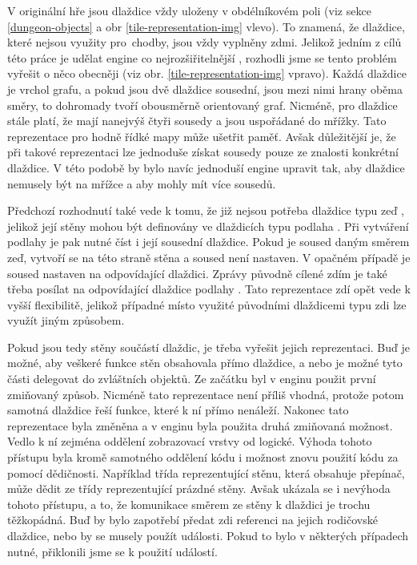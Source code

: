 V originální hře jsou dlaždice vždy uloženy v obdélníkovém poli (viz sekce \ref{dungeon-objects} a obr \ref{tile-representation-img} vlevo).
To znamená, že dlaždice, které nejsou využity pro~chodby, jsou vždy vyplněny zdmi. Jelikož jedním z cílů této práce je udělat engine co 
nejrozšiřitelnější , rozhodli jsme se tento problém vyřešit o něco obecněji (viz obr. \ref{tile-representation-img} vpravo).
Každá dlaždice je vrchol grafu, a pokud 
jsou dvě dlaždice sousední, jsou mezi nimi hrany oběma směry, to dohromady tvoří obousměrně orientovaný graf.
Nicméně, pro dlaždice stále platí, že mají nanejvýš čtyři sousedy a jsou uspořádané do mřížky. Tato reprezentace pro hodně řídké mapy může ušetřit paměť.
Avšak důležitější je, že při takové reprezentaci lze jednoduše získat sousedy pouze ze znalosti konkrétní dlaždice. V této 
podobě by bylo navíc jednoduší engine upravit tak, aby dlaždice nemusely být na mřížce a aby mohly mít více sousedů.


Předchozí rozhodnutí také vede k tomu, že již nejsou potřeba dlaždice typu zeď , jelikož její stěny mohou být definovány ve 
dlaždicích typu podlaha . Při vytváření podlahy je pak nutné číst i její sousední dlaždice. Pokud je soused daným směrem zeď, 
vytvoří se na této straně stěna a soused není nastaven. V opačném případě je soused nastaven na odpovídající dlaždici.
Zprávy původně cílené zdím je také třeba posílat na odpovídající dlaždice podlahy . Tato reprezentace zdí opět vede k
vyšší flexibilitě, jelikož případné místo využité původními dlaždicemi typu zdi lze využít jiným způsobem.


Pokud jsou tedy stěny součástí dlaždic, je třeba vyřešit jejich reprezentaci. Buď je možné, aby veškeré funkce stěn obsahovala přímo
dlaždice, a nebo je možné tyto části delegovat do zvláštních objektů. Ze začátku byl v enginu použit první zmiňovaný způsob. Nicméně 
tato reprezentace není příliš vhodná, protože potom samotná dlaždice řeší funkce, které k ní přímo nenáleží.
Nakonec tato reprezentace byla změněna a v enginu byla použita druhá zmiňovaná možnost. Vedlo k ní zejména oddělení zobrazovací vrstvy 
od logické. Výhoda tohoto přístupu byla kromě samotného oddělení kódu i možnost znovu použití kódu za pomocí dědičnosti. 
Například třída reprezentující stěnu, která obsahuje přepínač, může dědit ze třídy reprezentující prázdné stěny. 
Avšak ukázala se i nevýhoda tohoto přístupu, a to, že komunikace směrem ze stěny k dlaždici je trochu těžkopádná.
Buď by bylo zapotřebí předat zdi referenci na jejich rodičovské dlaždice, nebo by se musely
použít události. Pokud to bylo v některých případech nutné, přiklonili jsme se k použití událostí.

